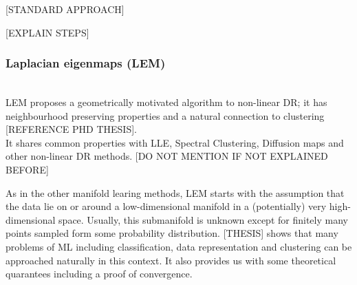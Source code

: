 \documentclass[journal, a4paper]{IEEEtran}
\begin{document}
[STANDARD APPROACH]


[EXPLAIN STEPS]





\subsubsection{Laplacian eigenmaps (LEM)}\\








LEM proposes a geometrically motivated algorithm to non-linear DR; it has neighbourhood preserving properties and a natural connection to clustering [REFERENCE PHD THESIS]. \\

It shares common properties with LLE, Spectral Clustering, Diffusion maps and other non-linear DR methods.
[DO NOT MENTION IF NOT EXPLAINED BEFORE]

As in the other manifold learing methods, LEM starts with the assumption that the data lie on or around a low-dimensional manifold in a (potentially) very high-dimensional space. 
Usually, this submanifold is unknown except for finitely many points sampled form some probability distribution. [THESIS] shows that many problems of ML including classification, data representation and clustering can be approached naturally in this context. It also provides us with some theoretical quarantees including a proof of convergence. 
\end{document}
